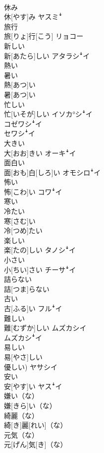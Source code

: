 \documentclass[8pt]{extreport}
\begin{document}
\begin{CJK}{UTF8}{min}
\\	休み	
\\	休[やす]み	ヤスミꜜ
\\	旅行	
\\	旅[りょ]行[こう]	リョコー
\\	新しい	
\\	新[あたら]しい	アタラシꜜイ
\\	熱い 
\\	暑い	
\\	熱[あつ]い 
\\	暑[あつ]い	
\\	忙しい	
\\	忙[いそが]しい	イソカ°シꜜイ 
\\	コゼワシꜜイ 
\\	セワシꜜイ
\\	大きい	
\\	大[おお]きい	オーキꜜイ
\\	面白い	
\\	面[おも]白[しろ]い	オモシロꜜイ
\\	怖い	
\\	怖[こわ]い	コワꜜイ
\\	寒い 
\\	冷たい	
\\	寒[さむ]い 
\\	冷[つめ]たい	
\\	楽しい	
\\	楽[たの]しい	タノシꜜイ
\\	小さい	
\\	小[ちい]さい	チーサꜜイ
\\	詰らない	
\\	詰[つま]らない	
\\	古い	
\\	古[ふる]い	フルꜜイ
\\	難しい	
\\	難[むずか]しい	ムズカシイ 
\\	ムズカシꜜイ
\\	易しい	
\\	易[やさ]しい 
\\	優しい)	ヤサシイ
\\	安い	
\\	安[やす]い	ヤスꜜイ
\\	嫌い（な）	
\\	嫌[きら]い（な）	
\\	綺麗（な）	
\\	綺[き]麗[れい]（な）	
\\	元気（な）	
\\	元[げん]気[き]（な）	

\end{CJK}
\end{document}
